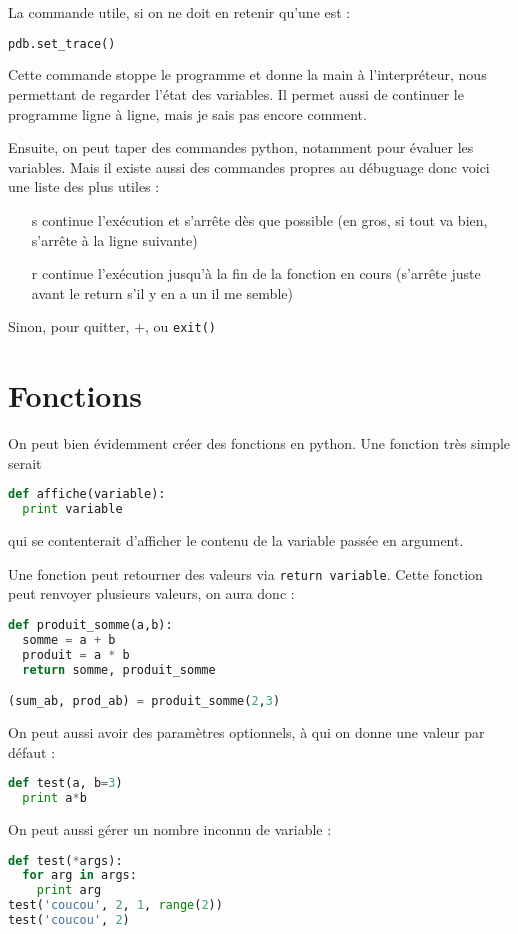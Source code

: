 \documentclass[a4paper,twoside]{article}
\begin{document}
La commande utile, si on ne doit en retenir qu'une est :
\begin{lstlisting}[language=python]
pdb.set_trace()
\end{lstlisting}

Cette commande stoppe le programme et donne la main à l'interpréteur, nous permettant de regarder l'état des variables. Il permet aussi de continuer le programme ligne à ligne, mais je sais pas encore comment.

Ensuite, on peut taper des commandes python, notamment pour évaluer les variables. Mais il existe aussi des commandes propres au débuguage donc voici une liste des plus utiles :
\begin{itemize}
\item[s] continue l'exécution et s'arrête dès que possible (en gros, si tout va bien, s'arrête à la ligne suivante)
\item[r] continue l'exécution jusqu'à la fin de la fonction en cours (s'arrête juste avant le return s'il y en a un il me semble)
\end{itemize}
Sinon, pour quitter, +, ou \texttt{exit()}

\section{Fonctions}
On peut bien évidemment créer des fonctions en python. Une fonction très simple serait
\begin{lstlisting}[language=python]
def affiche(variable):
  print variable
\end{lstlisting}
qui se contenterait d'afficher le contenu de la variable passée en argument.

Une fonction peut retourner des valeurs via \verb|return variable|. Cette fonction peut renvoyer plusieurs valeurs, on aura donc :
\begin{lstlisting}[language=python]
def produit_somme(a,b):
  somme = a + b
  produit = a * b
  return somme, produit_somme

(sum_ab, prod_ab) = produit_somme(2,3)
\end{lstlisting}

On peut aussi avoir des paramètres optionnels, à qui on donne une valeur par défaut :
\begin{lstlisting}[language=python]
def test(a, b=3)
  print a*b
\end{lstlisting}

On peut aussi gérer un nombre inconnu de variable :
\begin{lstlisting}[language=python]
def test(*args):
  for arg in args:
    print arg
test('coucou', 2, 1, range(2))
test('coucou', 2)
\end{lstlisting}
\end{document}
